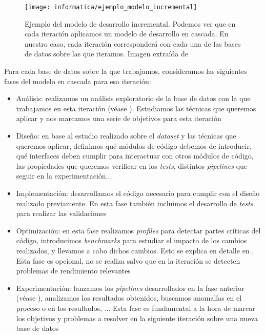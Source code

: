 \begin{figure}[H]
    \centering
    \texttt{[image: informatica/ejemplo\_modelo\_incremental]}
    \caption{Ejemplo del modelo de desarrollo incremental. Podemos ver que en cada iteración aplicamos un modelo de desarrollo en cascada. En nuestro caso, cada iteración corresponderá con cada una de las bases de datos sobre las que iteramos. Imagen extraída de \cite{informatica:libro_metodologias_desarrollo}}
\end{figure}

Para cada base de datos sobre la que trabajamos, consideramos las siguientes fases del modelo en cascada para esa iteración:

\begin{itemize}
    \item Análisis: realizamos un análisis exploratorio de la base de datos con la que trabajamos en esta iteración (véase ). Estudiamos las técnicas que queremos aplicar y nos marcamos una serie de objetivos para esta iteración
    \item Diseño: en base al estudio realizado sobre el \textit{dataset} y las técnicas que queremos aplicar, definimos qué módulos de código debemos de introducir, qué interfaces deben cumplir para interactuar con otros módulos de código, las propiedades que queremos verificar en los \textit{tests}, distintos \textit{pipelines} que seguir en la experimentación...
    \item Implementación: desarrollamos el código necesario para cumplir con el diseño realizado previamente. En esta fase también incluimos el desarrollo de \textit{tests} para realizar las validaciones
    \item Optimización: en esta fase realizamos \textit{profiles} para detectar partes críticas del código, introducimos \textit{benchmarks} para estudiar el impacto de los cambios realizados, y llevamos a cabo dichos cambios. Esto se explica en detalle en . Esta fase es opcional, no se realiza salvo que en la iteración se detecten problemas de rendimiento relevantes
    \item Experimentación: lanzamos los \textit{pipelines} desarrollados en la fase anterior (véase ), analizamos los resultados obtenidos, buscamos anomalías en el proceso o en los resultados, ... Esta fase es fundamental a la hora de marcar los objetivos y problemas a resolver en la siguiente iteración sobre una nueva base de datos
\end{itemize}

